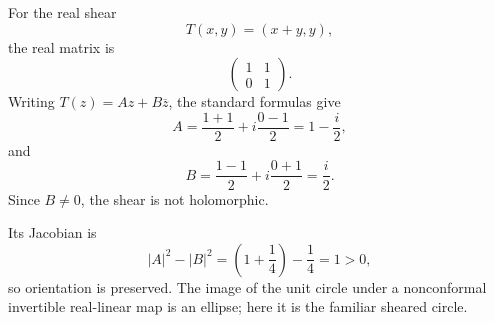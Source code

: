 \begin{solution}
For the real shear
\[
T(x,y)=(x+y,y),
\]
the real matrix is
\[
\begin{pmatrix}1&1\\0&1\end{pmatrix}.
\]
Writing \(T(z)=Az+B\overline z\), the standard formulas give
\[
A=\frac{1+1}{2}+i\frac{0-1}{2}
=
1-\frac{i}{2},
\]
and
\[
B=\frac{1-1}{2}+i\frac{0+1}{2}
=
\frac{i}{2}.
\]
Since \(B\neq0\), the shear is not holomorphic.

Its Jacobian is
\[
|A|^2-|B|^2
=
\left(1+\frac14\right)-\frac14
=
1>0,
\]
so orientation is preserved. The image of the unit circle under a nonconformal invertible real-linear map is an ellipse; here it is the familiar sheared circle.
\end{solution}


